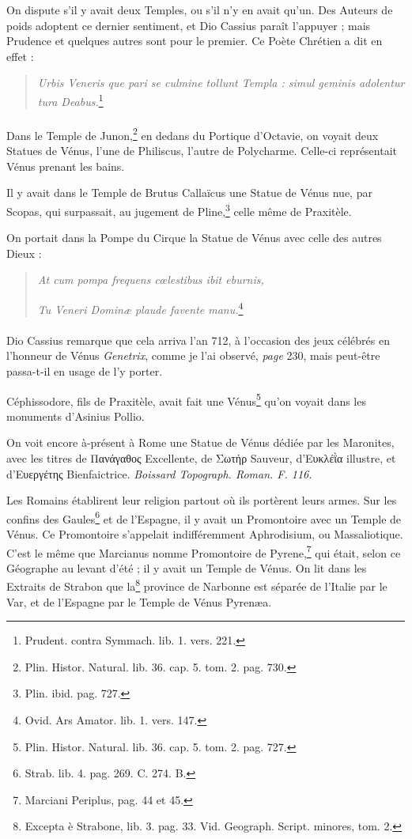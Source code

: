 \documentclass[a4paper, 11pt, oneside, polutonikogreek, french]{article}
\begin{document}
On dispute s'il y avait deux Temples, ou s'il n'y en avait qu'un. Des Auteurs de poids adoptent ce dernier sentiment, et Dio Cassius paraît l'appuyer ; mais Prudence et quelques autres sont pour le premier. Ce Poète Chrétien a dit en effet :
\begin{quotation}
\emph{Urbis Veneris que pari se culmine tollunt Templa : simul geminis adolentur tura Deabus.}\footnote{Prudent. contra Symmach. lib. 1. vers. 221.}
\end{quotation}
\paragraph{}
Dans le Temple de Junon,\footnote{Plin. Histor. Natural. lib. 36. cap. 5. tom. 2. pag. 730.} en dedans du Portique d'Octavie, on voyait deux Statues de Vénus, l'une de Philiscus, l'autre de Polycharme. Celle-ci représentait Vénus prenant les bains.

Il y avait dans le Temple de Brutus Callaïcus une Statue de Vénus nue, par Scopas, qui surpassait, au jugement de Pline,\footnote{Plin. ibid. pag. 727.} celle même de Praxitèle.

On portait dans la Pompe du Cirque la Statue de Vénus avec celle des autres Dieux :
\begin{quotation}
\emph{At cum pompa frequens cœlestibus ibit eburnis,}

\hspace*{5mm}\emph{Tu Veneri Dominæ plaude favente manu.}\footnote{Ovid. Ars Amator. lib. 1. vers. 147.}
\end{quotation}
\paragraph{}
Dio Cassius remarque que cela arriva l'an 712, à l'occasion des jeux célébrés en l'honneur de Vénus \emph{Genetrix}, comme je l'ai observé, \emph{page} 230, mais peut-être passa-t-il en usage de l'y porter.

Céphissodore, fils de Praxitèle, avait fait une Vénus\footnote{Plin. Histor. Natural. lib. 36. cap. 5. tom. 2. pag. 727.} qu'on voyait dans les monuments d'Asinius Pollio.

On voit encore à-présent à Rome une Statue de Vénus dédiée par les Maronites, avec les titres de Πανάγαθος Excellente, de Σωτήρ Sauveur, d'Ευκλέῒα illustre, et d'Ευεργέτης Bienfaictrice. \emph{Boissard Topograph. Roman. F. 116.}

Les Romains établirent leur religion partout où ils portèrent leurs armes. Sur les confins des Gaules\footnote{Strab. lib. 4. pag. 269. C. 274. B.} et de l'Espagne, il y avait un Promontoire avec un Temple de Vénus. Ce Promontoire s'appelait indifféremment Aphrodisium, ou Massaliotique. C'est le même que Marcianus nomme Promontoire de Pyrene,\footnote{Marciani Periplus, pag. 44 et 45.} qui était, selon ce Géographe au levant d'été ; il y avait un Temple de Vénus. On lit dans les Extraits de Strabon que la\footnote{Excepta è Strabone, lib. 3. pag. 33. Vid. Geograph. Script. minores, tom. 2.} province de Narbonne est séparée de l'Italie par le Var, et de l'Espagne par le Temple de Vénus Pyrenæa.
\end{document}

